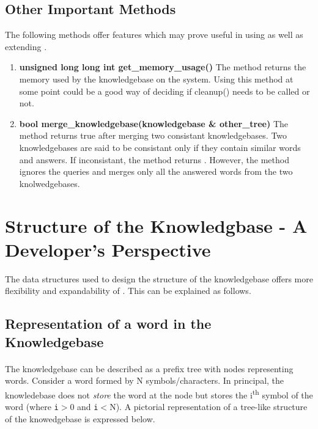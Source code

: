 \subsection*{Other Important Methods}
The following methods offer features which may prove useful in using as well as extending \libalf.
\begin{enumerate}
\item \textbf{unsigned long long int get\_memory\_usage()} \vskip 1pt
The method returns the memory used by the knowledgebase on the system. Using this method at some point could be a good way of deciding if cleanup() needs to be called or not. 
		
\item \textbf{bool merge\_knowledgebase(knowledgebase \& other\_tree)} \vskip 1pt
The method returns true after merging two consistant knowledgebases. Two knowledgebases are said to be consistant only if they contain similar words and answers. If inconsistant, the method returns \false. However, the method ignores the queries and merges only all the answered words from the two knolwedgebases.

\end{enumerate}



\section{Structure of the Knowledgbase - A Developer's Perspective}
The data structures used to design the structure of the knowledgebase offers more flexibility and expandability of \libalf. This can be explained as follows.

\subsection{Representation of a word in the Knowledgebase}
\paragraph{}
The knowledgebase can be described as a prefix tree with nodes representing words. Consider a word formed by N symbols/characters. In principal, the knowledebase does not \emph{store} the word at the node but stores the i\textsuperscript{th} symbol of the word (where \texttt{i}$>$0 and \texttt{i}$<$N). A pictorial representation of a tree-like structure of the knowedgebase is expressed below.

\begin{center}
\end{center}


